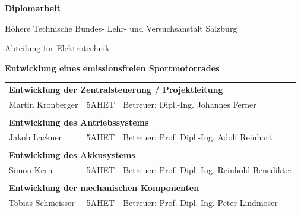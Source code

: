 \vspace*{20mm}
\begin{center} 
\begin{Huge}\textbf{Diplomarbeit}\end{Huge} \par \bigskip 
\begin{Large}Höhere Technische Bundes- Lehr- und Versuchsanstalt Salzburg \par \medskip 
Abteilung für Elektrotechnik\end{Large} 
\vspace*{20mm}

\begin{Huge}
\textbf{Entwicklung eines emissionsfreien Sportmotorrades \\[1ex]}
\end{Huge}
\vspace{\fill}

\begin{tabular}{lll}
\multicolumn{3}{l}{\textbf{Entwicklung der Zentralsteuerung / Projektleitung}} \\
 Martin Kronberger & 5AHET & Betreuer: Dipl.-Ing. Johannes Ferner\\
      &       &      \\
\multicolumn{3}{l}{\textbf{Entwicklung des Antriebssystems}}\\
Jakob Lackner & 5AHET & Betreuer: Prof. Dipl.-Ing. Adolf Reinhart \\
      &       &      \\
\multicolumn{3}{l}{\textbf{Entwicklung des Akkusystems}} \\
Simon Kern & 5AHET & Betreuer: Prof. Dipl.-Ing. Reinhold Benedikter\\
      &       &      \\
\multicolumn{3}{l}{\textbf{Entwicklung der mechanischen Komponenten}} \\
Tobias Schmeisser & 5AHET & Betreuer: Prof. Dipl.-Ing. Peter Lindmoser\\
\end{tabular}
\end{center}
\vspace{\fill}

